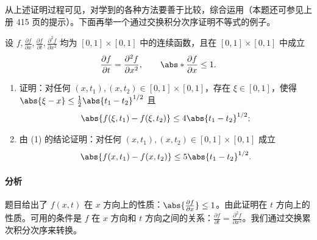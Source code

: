 从上述证明过程可见，对学到的各种方法要善于比较，综合运用（本题还可参见上册 415 页的提示）。下面再举一个通过交换积分次序证明不等式的例子。

\begin{xexample}[22.5.6]
设 $f,\frac{\partial f}{\partial x},\frac{\partial f}{\partial t},\frac{\partial^2f}{\partial x^2}$ 均为 $[0,1]\times[0,1]$ 中的连续函数，且在 $[0,1]\times[0,1]$ 中成立
\[
  \frac{\partial f}{\partial t}=\frac{\partial^2f}{\partial x^2},
  \qquad
  \abs*{\frac{\partial f}{\partial x}}\le1.
\]
\begin{enumerate}[label=(\arabic*)]
  \item 证明：对任何 $(x,t_1),(x,t_2)\in[0,1]\times[0,1]$，存在 $\xi\in[0,1]$，使得 $\abs{\xi-x}\le\frac12\abs{t_1-t_2}^{1/2}$ 且
  \[
    \abs{f(\xi,t_1)-f(\xi,t_2)}\le4\abs{t_1-t_2}^{1/2};
  \]
  \item 由 (1) 的结论证明：对任何 $(x,t_1),(x,t_2)\in[0,1]\times[0,1]$ 成立
  \[
    \abs{f(x,t_1)-f(x,t_2)}\le5\abs{t_1-t_2}^{1/2}.
  \]
\end{enumerate}
\end{xexample}
\paragraph{分析}题目给出了 $f(x,t)$ 在 $x$ 方向上的性质：$\abs{\frac{\partial f}{\partial x}}\le1$。由此证明在 $t$ 方向上的性质。可用的条件是 $f$ 在 $x$ 方向和 $t$ 方向之间的关系：$\frac{\partial f}{\partial t}=\frac{\partial^2f}{\partial x^2}$。我们通过交换累次积分次序来转换。


